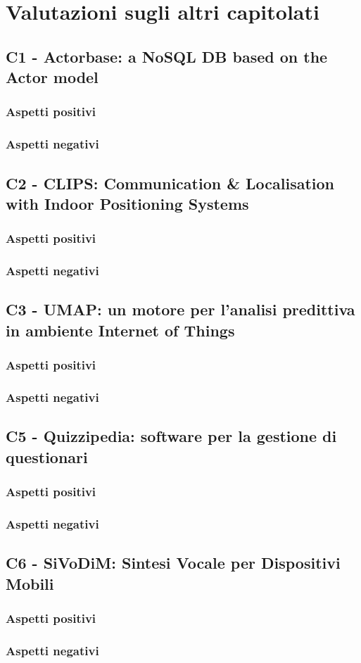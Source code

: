 \section{Valutazioni sugli altri capitolati}

\subsection{C1 - Actorbase: a NoSQL DB based on the Actor model}
\subsubsection{Aspetti positivi}
\subsubsection{Aspetti negativi}

\subsection{C2 - CLIPS: Communication & Localisation with Indoor Positioning Systems}
\subsubsection{Aspetti positivi}
\subsubsection{Aspetti negativi}

\subsection{C3 - UMAP: un motore per l'analisi predittiva in ambiente Internet of Things}
\subsubsection{Aspetti positivi}
\subsubsection{Aspetti negativi}

\subsection{C5 - Quizzipedia: software per la gestione di questionari}
\subsubsection{Aspetti positivi}
\subsubsection{Aspetti negativi}

\subsection{C6 - SiVoDiM: Sintesi Vocale per Dispositivi Mobili}
\subsubsection{Aspetti positivi}
\subsubsection{Aspetti negativi}


